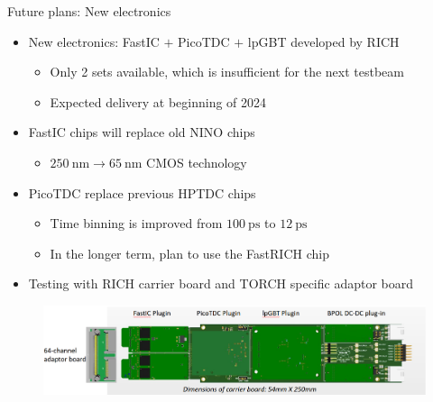 \documentclass[xcolor={dvipsnames}]{beamer}
\begin{document}
\begin{frame}{Future plans: New electronics}
  \begin{itemize}
    \setlength\itemsep{0.7em}
    \item{New electronics: FastIC $+$ PicoTDC $+$ lpGBT developed by RICH}
    \begin{itemize}
      \item{Only 2 sets available, which is insufficient for the next testbeam}
      \item{Expected delivery at beginning of 2024}
    \end{itemize}
    \item{FastIC chips will replace old NINO chips}
    \begin{itemize}
      \item{$\SI{250}{\nano\meter}\to\SI{65}{\nano\meter}$ CMOS technology}
    \end{itemize}
    \item{PicoTDC replace previous HPTDC chips}
    \begin{itemize}
      \item{Time binning is improved from $\SI{100}{\pico\second}$ to $\SI{12}{\pico\second}$}
      \item{In the longer term, plan to use the FastRICH chip}
    \end{itemize}
    \item{Testing with RICH carrier board and TORCH specific adaptor board}
  \end{itemize}
  \begin{figure}
    \centering
    \includegraphics[width = 1.0\textwidth]{Figs/NewTORCHElectronics.png}
  \end{figure}
\end{frame}
\end{document}
